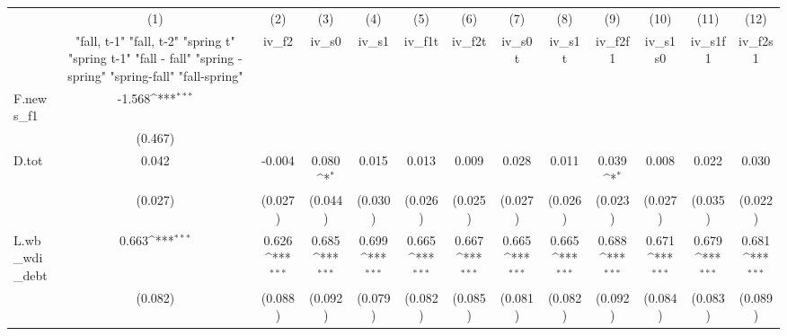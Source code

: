 {
\def\sym#1{\ifmmode^{#1}\else\(^{#1}\)\fi}
\begin{tabular}{l*{12}{c}}
\toprule
            &\multicolumn{1}{c}{(1)}&\multicolumn{1}{c}{(2)}&\multicolumn{1}{c}{(3)}&\multicolumn{1}{c}{(4)}&\multicolumn{1}{c}{(5)}&\multicolumn{1}{c}{(6)}&\multicolumn{1}{c}{(7)}&\multicolumn{1}{c}{(8)}&\multicolumn{1}{c}{(9)}&\multicolumn{1}{c}{(10)}&\multicolumn{1}{c}{(11)}&\multicolumn{1}{c}{(12)}\\
            &\multicolumn{1}{c}{  "fall, t-1" "fall, t-2" "spring t" "spring t-1"  "fall - fall" "spring - spring" "spring-fall" "fall-spring" }&\multicolumn{1}{c}{iv\_f2}&\multicolumn{1}{c}{iv\_s0}&\multicolumn{1}{c}{iv\_s1}&\multicolumn{1}{c}{iv\_f1t}&\multicolumn{1}{c}{iv\_f2t}&\multicolumn{1}{c}{iv\_s0t}&\multicolumn{1}{c}{iv\_s1t}&\multicolumn{1}{c}{iv\_f2f1}&\multicolumn{1}{c}{iv\_s1s0}&\multicolumn{1}{c}{iv\_s1f1}&\multicolumn{1}{c}{iv\_f2s1}\\
\midrule
F.news\_f1   &      -1.568\sym{***}&                     &                     &                     &                     &                     &                     &                     &                     &                     &                     &                     \\
            &     (0.467)         &                     &                     &                     &                     &                     &                     &                     &                     &                     &                     &                     \\
\addlinespace
D.tot       &       0.042         &      -0.004         &       0.080\sym{*}  &       0.015         &       0.013         &       0.009         &       0.028         &       0.011         &       0.039\sym{*}  &       0.008         &       0.022         &       0.030         \\
            &     (0.027)         &     (0.027)         &     (0.044)         &     (0.030)         &     (0.026)         &     (0.025)         &     (0.027)         &     (0.026)         &     (0.023)         &     (0.027)         &     (0.035)         &     (0.022)         \\
\addlinespace
L.wb\_wdi\_debt&       0.663\sym{***}&       0.626\sym{***}&       0.685\sym{***}&       0.699\sym{***}&       0.665\sym{***}&       0.667\sym{***}&       0.665\sym{***}&       0.665\sym{***}&       0.688\sym{***}&       0.671\sym{***}&       0.679\sym{***}&       0.681\sym{***}\\
            &     (0.082)         &     (0.088)         &     (0.092)         &     (0.079)         &     (0.082)         &     (0.085)         &     (0.081)         &     (0.082)         &     (0.092)         &     (0.084)         &     (0.083)         &     (0.089)         \\

\end{tabular}}
